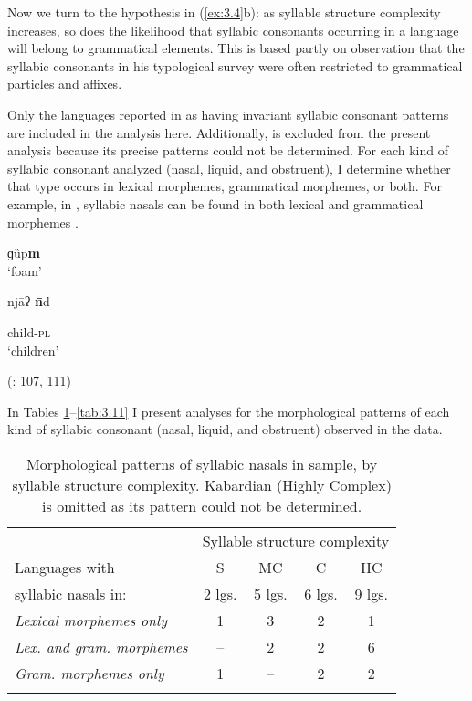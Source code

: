   Now we turn to the hypothesis in (\ref{ex:3.4}b): as syllable structure complexity increases, so does the likelihood that syllabic consonants occurring in a language will belong to grammatical elements. This is based partly on  observation that the syllabic consonants in his typological survey were often restricted to grammatical particles and affixes.

  Only the languages reported in  as having invariant syllabic consonant patterns are included in the analysis here. Additionally,  is excluded from the present analysis because its precise patterns could not be determined. For each kind of syllabic consonant analyzed (nasal, liquid, and obstruent), I determine whether that type occurs in lexical morphemes, grammatical morphemes, or both. For example, in , syllabic nasals can be found in both lexical and grammatical morphemes .

\ea\label{ex:3.25}

\ea   ɡȕp\textbf{\={m}}\\
\glt ‘foam’

\ex   njāʔ-\textbf{\={n}}d

child-\textsc{pl}\\
\glt ‘children’

(\citealt{Rapold2006}: 107, 111)
\z
\z

  In Tables \ref{tab:3.9}--\ref{tab:3.11} I present analyses for the morphological patterns of each kind of syllabic consonant (nasal, liquid, and obstruent) observed in the data.

\begin{table}
\begin{tabular}{lcccc}
\lsptoprule
 & \multicolumn{4}{c}{Syllable structure complexity}\\\cmidrule(lr){2-5}
Languages with & S & MC & C & HC\\
syllabic nasals in: & 2 lgs. & 5 lgs. & 6 lgs. & 9 lgs.\\\midrule
 \textit{Lexical morphemes only} & 1 & 3 & 2 & 1\\
 \textit{Lex. and gram. morphemes} & -- & 2 & 2 & 6\\
\textit{Gram. morphemes only} & 1 & -- & 2 & 2\\
\lspbottomrule
\end{tabular}
\caption{\label{tab:3.9}Morphological patterns of syllabic nasals in sample, by syllable structure complexity. Kabardian (Highly Complex) is omitted as its pattern could not be determined.}
\end{table}




